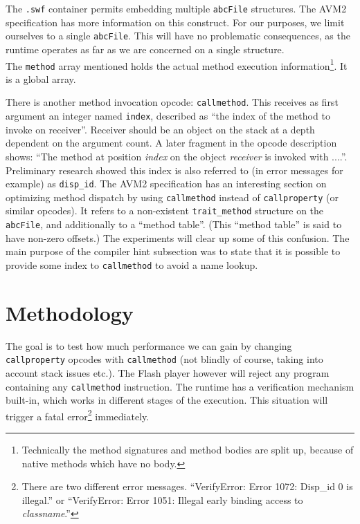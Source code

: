 \documentclass[a4paper,11pt]{scrartcl}
\begin{document}
The \texttt{.swf} container permits embedding multiple \texttt{abcFile} structures. The AVM2 specification has more information on this construct. For our purposes, we limit ourselves to a single \texttt{abcFile}. This will have no problematic consequences, as the runtime operates as far as we are concerned on a single structure. \\
The \texttt{method} array mentioned holds the actual method execution information\footnote{Technically the method signatures and method bodies are split up, because of native methods which have no body.}. It is a global array.

There is another method invocation opcode: \texttt{callmethod}. This receives as first argument an integer named \texttt{index}, described as ``the index of the method to invoke on receiver''. Receiver should be an object on the stack at a depth dependent on the argument count. A later fragment in the opcode description shows: ``The method at position \textit{index} on the object \textit{receiver} is invoked with ....''. Preliminary research showed this index is also referred to (in error messages for example) as \texttt{disp\_id}. The AVM2 specification has an interesting section on optimizing method dispatch by using \texttt{callmethod} instead of \texttt{callproperty} (or similar opcodes). It refers to a non-existent \texttt{trait\_method} structure on the \texttt{abcFile}, and additionally to a ``method table''. (This ``method table'' is said to have non-zero offsets.) The experiments will clear up some of this confusion. The main purpose of the compiler hint subsection was to state that it is possible to provide some index to \texttt{callmethod} to avoid a name lookup.


\section{Methodology}
\label{sec:methodology}

The goal is to test how much performance we can gain by changing \texttt{callproperty} opcodes with \texttt{callmethod} (not blindly of course, taking into account stack issues etc.). The Flash player however will reject any program containing any \texttt{callmethod} instruction. The runtime has a verification mechanism built-in, which works in different stages of the execution. This situation will trigger a fatal error\footnote{There are two different error messages. ``VerifyError: Error 1072: Disp\_id 0 is illegal.'' or ``VerifyError: Error 1051: Illegal early binding access to \textit{classname}.'' } immediately.
\end{document}
